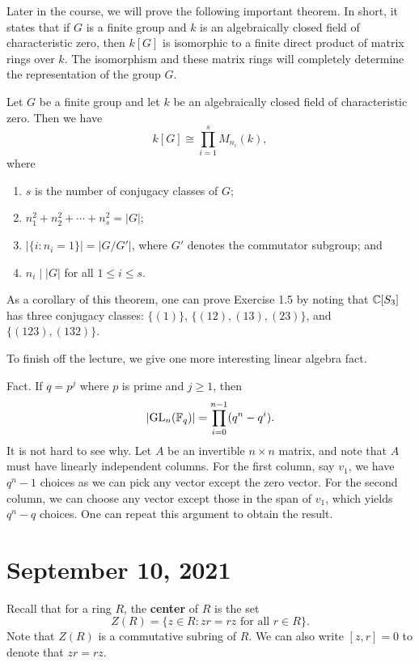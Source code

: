 Later in the course, we will prove the following important theorem. In short, it states that if 
$G$ is a finite group and $k$ is an algebraically closed field of characteristic zero, then $k[G]$ is
isomorphic to a finite direct product of matrix rings over $k$. The isomorphism and these matrix rings
will completely determine the representation of the group $G$. 

\begin{theo}{}
Let $G$ be a finite group and let $k$ be an algebraically closed field of characteristic zero. 
Then we have 
\[ k[G] \cong \prod_{i=1}^s M_{n_i}(k), \]
where
\begin{enumerate}[(1)]
    \item $s$ is the number of conjugacy classes of $G$;
    \item $n_1^2 + n_2^2 + \cdots + n_s^2 = |G|$;
    \item $|\{i : n_i = 1\}| = |G/G'|$, where $G'$ denotes the commutator subgroup; and 
    \item $n_i \mid |G|$ for all $1 \leq i \leq s$. 
\end{enumerate}
\end{theo}

As a corollary of this theorem, one can prove Exercise 1.5 by noting that $\mathbb{C}[S_3]$ has three 
conjugacy classes: $\{(1)\}$, $\{(12), (13), (23)\}$, and $\{(123), (132)\}$. 

To finish off the lecture, we give one more interesting linear algebra fact. 

{\sc Fact.} If $q = p^j$ where $p$ is prime and $j \geq 1$, then 
\[ \lvert\operatorname{GL}_n(\mathbb{F}_q)\rvert = \prod_{i=0}^{n-1} (q^n - q^i). \]
It is not hard to see why. Let $A$ be an invertible $n \times n$ matrix, and note that $A$ must 
have linearly independent columns. For the first column, say $v_1$, we have 
$q^n - 1$ choices as we can pick any vector except the zero vector. For the second column, 
we can choose any vector except those in the span of $v_1$, which yields $q^n - q$ choices. 
One can repeat this argument to obtain the result. 

\section{September 10, 2021}

Recall that for a ring $R$, the {\bf center} of $R$ is the set 
\[ Z(R) = \{z \in R : zr = rz \text{ for all } r \in R\}. \]
Note that $Z(R)$ is a commutative subring of $R$. We can also write $[z, r] = 0$ to 
denote that $zr = rz$. 

